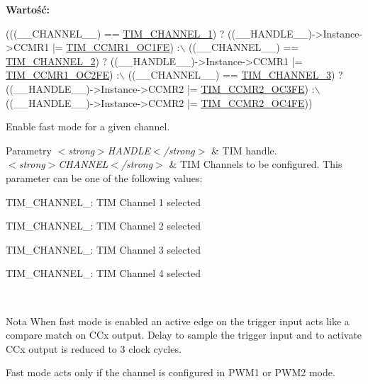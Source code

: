 {\bfseries Wartość\+:}
\begin{DoxyCode}
(((\_\_CHANNEL\_\_) == \hyperlink{group___t_i_m___channel_ga6b1541e4a49d62610899e24bf23f4879}{TIM\_CHANNEL\_1}) ? ((\_\_HANDLE\_\_)->Instance->CCMR1 |= 
      \hyperlink{group___peripheral___registers___bits___definition_gab9c5878e85ce02c22d8a374deebd1b6e}{TIM\_CCMR1\_OC1FE}) :\(\backslash\)
   ((\_\_CHANNEL\_\_) == \hyperlink{group___t_i_m___channel_ga33e02d43345a7ac5886f01b39e4f7ccd}{TIM\_CHANNEL\_2}) ? ((\_\_HANDLE\_\_)->Instance->CCMR1 |= 
      \hyperlink{group___peripheral___registers___bits___definition_ga3bf610cf77c3c6c936ce7c4f85992e6c}{TIM\_CCMR1\_OC2FE}) :\(\backslash\)
   ((\_\_CHANNEL\_\_) == \hyperlink{group___t_i_m___channel_ga4ea100c1789b178f3cb46721b7257e2d}{TIM\_CHANNEL\_3}) ? ((\_\_HANDLE\_\_)->Instance->CCMR2 |= 
      \hyperlink{group___peripheral___registers___bits___definition_gae6d8d2847058747ce23a648668ce4dba}{TIM\_CCMR2\_OC3FE}) :\(\backslash\)
   ((\_\_HANDLE\_\_)->Instance->CCMR2 |= \hyperlink{group___peripheral___registers___bits___definition_ga70dc197250c2699d470aea1a7a42ad57}{TIM\_CCMR2\_OC4FE}))
\end{DoxyCode}


Enable fast mode for a given channel. 


\begin{DoxyParams}{Parametry}
{\em $<$strong$>$\+H\+A\+N\+D\+L\+E$<$/strong$>$} & T\+IM handle. \\
\hline
{\em $<$strong$>$\+C\+H\+A\+N\+N\+E\+L$<$/strong$>$} & T\+IM Channels to be configured. This parameter can be one of the following values\+: \begin{DoxyItemize}
\item T\+I\+M\+\_\+\+C\+H\+A\+N\+N\+E\+L\+\_\+: T\+IM Channel 1 selected \item T\+I\+M\+\_\+\+C\+H\+A\+N\+N\+E\+L\+\_\+: T\+IM Channel 2 selected \item T\+I\+M\+\_\+\+C\+H\+A\+N\+N\+E\+L\+\_\+: T\+IM Channel 3 selected \item T\+I\+M\+\_\+\+C\+H\+A\+N\+N\+E\+L\+\_\+: T\+IM Channel 4 selected \end{DoxyItemize}
\\
\hline
\end{DoxyParams}
\begin{DoxyNote}{Nota}
When fast mode is enabled an active edge on the trigger input acts like a compare match on C\+Cx output. Delay to sample the trigger input and to activate C\+Cx output is reduced to 3 clock cycles. 

Fast mode acts only if the channel is configured in P\+W\+M1 or P\+W\+M2 mode. 
\end{DoxyNote}

